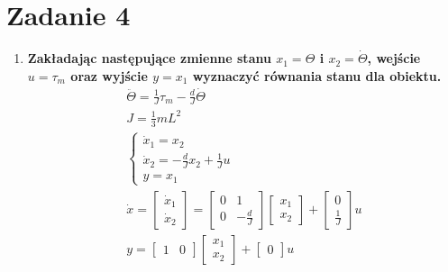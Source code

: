 \documentclass[12pt]{article}
\begin{document}
    \section{Zadanie 4}
        \begin{enumerate}
            \item \textbf{Zakładając następujące zmienne stanu $x_1=\Theta$ i $x_2=\dot{\Theta}$, wejście $u=\tau_m$ oraz wyjście
            $y=x_1$ wyznaczyć równania stanu dla obiektu.}
            \begin{equation*}
                \begin{split}
                    \ddot{\Theta}=\frac{1}{J}\tau_m-\frac{d}{J}\dot{\Theta}\\
                    J=\frac{1}{3}mL^2\\
                    \begin{cases}
                        \dot{x}_1=x_2\\
                        \dot{x}_2=-\frac{d}{J}x_2+\frac{1}{J}u\\
                        y=x_1
                    \end{cases}\\
                    \dot{x}=
                    \begin{bmatrix}
                        \dot{x}_1\\
                        \dot{x}_2
                    \end{bmatrix}=
                    \begin{bmatrix}
                        0& 1\\
                        0& -\frac{d}{J}
                    \end{bmatrix}
                    \begin{bmatrix}
                        x_1\\
                        x_2
                    \end{bmatrix}+
                    \begin{bmatrix}
                        0\\
                        \frac{1}{J}
                    \end{bmatrix}u\\
                    y=
                    \begin{bmatrix}
                        1&0
                    \end{bmatrix}
                    \begin{bmatrix}
                        x_1\\
                        x_2
                    \end{bmatrix}+
                    \begin{bmatrix}
                        0
                    \end{bmatrix}u
                \end{split}
            \end{equation*}


\end{enumerate}
\end{document}

